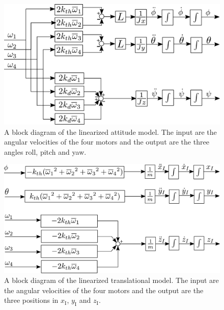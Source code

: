 \begin{figure}[H]
	\centering
	\includegraphics[scale=0.35]{figures/linearModelBlockDiag.pdf}
	\caption{A block diagram of the linearized attitude model. The input are the angular velocities of the four motors and the output are the three angles roll, pitch and yaw.}
	\label{fig:LinearModelBlockDiagram}
\end{figure}

\begin{figure}[H]
	\centering
	\includegraphics[scale=0.35]{figures/TranslationalLinearModelBlockDiagram.pdf}
	\caption{A block diagram of the linearized translational model. The input are the angular velocities of the four motors and the output are the three positions in $x_{\mathrm{I}}$, $y_{\mathrm{I}}$ and $z_{\mathrm{I}}$.}	\label{fig:TranslationalLinearModelBlockDiagram}
\end{figure}

